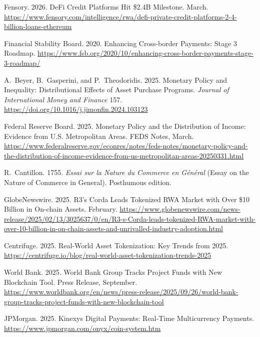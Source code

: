 \documentclass[12pt,a4paper]{report}
\begin{document}
{\begin{enumerate}[label={[\arabic*]}]
\item Fensory. 2026. DeFi Credit Platforms Hit \$2.4B Milestone. March. \url{https://www.fensory.com/intelligence/rwa/defi-private-credit-platforms-2-4-billion-loans-ethereum}

\item Financial Stability Board. 2020. Enhancing Cross-border Payments: Stage 3 Roadmap. \url{https://www.fsb.org/2020/10/enhancing-cross-border-payments-stage-3-roadmap/}

\item A.~Beyer, B.~Gasperini, and P.~Theodoridis. 2025. Monetary Policy and Inequality: Distributional Effects of Asset Purchase Programs. \emph{Journal of International Money and Finance} 157. \url{https://doi.org/10.1016/j.jimonfin.2024.103123}

\item Federal Reserve Board. 2025. Monetary Policy and the Distribution of Income: Evidence from U.S. Metropolitan Areas. FEDS Notes, March. \url{https://www.federalreserve.gov/econres/notes/feds-notes/monetary-policy-and-the-distribution-of-income-evidence-from-us-metropolitan-areas-20250331.html}

\item R.~Cantillon. 1755. \emph{Essai sur la Nature du Commerce en G\'en\'eral} (Essay on the Nature of Commerce in General). Posthumous edition.

\item GlobeNewswire. 2025. R3's Corda Leads Tokenized RWA Market with Over \$10 Billion in On-chain Assets. February. \url{https://www.globenewswire.com/news-release/2025/02/13/3025637/0/en/R3-s-Corda-leads-tokenized-RWA-market-with-over-10-billion-in-on-chain-assets-and-unrivalled-industry-adoption.html}

\item Centrifuge. 2025. Real-World Asset Tokenization: Key Trends from 2025. \url{https://centrifuge.io/blog/real-world-asset-tokenization-trends-2025}

\item World Bank. 2025. World Bank Group Tracks Project Funds with New Blockchain Tool. Press Release, September. \url{https://www.worldbank.org/en/news/press-release/2025/09/26/world-bank-group-tracks-project-funds-with-new-blockchain-tool}

\item JPMorgan. 2025. Kinexys Digital Payments: Real-Time Multicurrency Payments. \url{https://www.jpmorgan.com/onyx/coin-system.htm}


\end{enumerate}}
\end{document}
